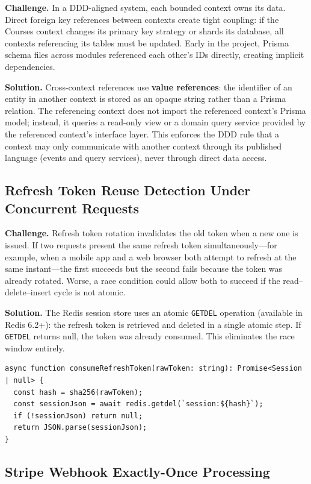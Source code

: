 \textbf{Challenge.} In a DDD-aligned system, each bounded context owns its data. Direct foreign key references between contexts create tight coupling: if the Courses context changes its primary key strategy or shards its database, all contexts referencing its tables must be updated. Early in the project, Prisma schema files across modules referenced each other's IDs directly, creating implicit dependencies.

\textbf{Solution.} Cross-context references use \textbf{value references}: the identifier of an entity in another context is stored as an opaque string rather than a Prisma relation. The referencing context does not import the referenced context's Prisma model; instead, it queries a read-only view or a domain query service provided by the referenced context's interface layer. This enforces the DDD rule that a context may only communicate with another context through its published language (events and query services), never through direct data access.

\subsection{Refresh Token Reuse Detection Under Concurrent Requests}

\textbf{Challenge.} Refresh token rotation invalidates the old token when a new one is issued. If two requests present the same refresh token simultaneously---for example, when a mobile app and a web browser both attempt to refresh at the same instant---the first succeeds but the second fails because the token was already rotated. Worse, a race condition could allow both to succeed if the read--delete--insert cycle is not atomic.

\textbf{Solution.} The Redis session store uses an atomic \texttt{GETDEL} operation (available in Redis 6.2+): the refresh token is retrieved and deleted in a single atomic step. If \texttt{GETDEL} returns null, the token was already consumed. This eliminates the race window entirely.

\begin{lstlisting}[caption=Atomic refresh token consumption,label=lst:redis-getdel]
async function consumeRefreshToken(rawToken: string): Promise<Session | null> {
  const hash = sha256(rawToken);
  const sessionJson = await redis.getdel(`session:${hash}`);
  if (!sessionJson) return null;
  return JSON.parse(sessionJson);
}
\end{lstlisting}

\subsection{Stripe Webhook Exactly-Once Processing}

